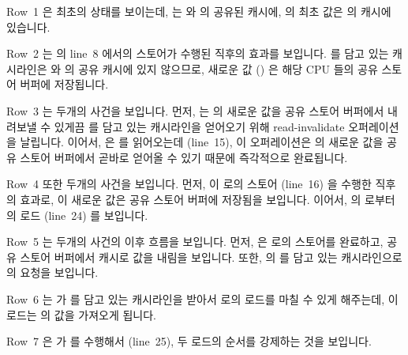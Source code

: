 Row~1 은 최초의 상태를 보이는데,  는  와  의 공유된
캐시에,  의 최초 값은  의 캐시에 있습니다.

Row~2 는  의 line~8 에서의 스토어가 수행된 직후의 효과를 보입니다.
 를 담고 있는 캐시라인은  와  의 공유 캐시에 있지
않으므로, 새로운 값 () 은 해당 CPU 들의 공유 스토어 버퍼에 저장됩니다.

Row~3 는 두개의 사건을 보입니다.
먼저,  는  의 새로운 값을 공유 스토어 버퍼에서 내려보낼 수
있게끔  를 담고 있는 캐시라인을 얻어오기 위해 read-invalidate
오퍼레이션을 날립니다.
이어서,  은  를 읽어오는데 (line~15), 이 오퍼레이션은  의
새로운 값을 공유 스토어 버퍼에서 곧바로 얻어올 수 있기 때문에 즉각적으로
완료됩니다.

Row~4 또한 두개의 사건을 보입니다.
먼저,  이  로의 스토어 (line~16) 을 수행한 직후의 효과로, 이
새로운 값은 공유 스토어 버퍼에 저장됨을 보입니다.
이어서,  의  로부터의 로드 (line~24) 를 보입니다.

Row~5 는 두개의 사건의 이후 흐름을 보입니다.
먼저,  은  로의 스토어를 완료하고, 공유 스토어 버퍼에서 캐시로
값을 내림을 보입니다.
또한,  의  를 담고 있는 캐시라인으로의 요청을 보입니다.

Row~6 는  가  를 담고 있는 캐시라인을 받아서  로의 로드를
마칠 수 있게 해주는데, 이 로드는  의 값을 가져오게 됩니다.

Row~7 은  가  를 수행해서 (line~25), 두 로드의 순서를
강제하는 것을 보입니다.
\iffalse

